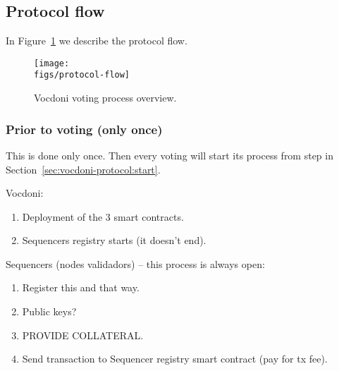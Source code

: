 \subsection{Protocol flow}
\label{sec:vocdoni-protocol:flow}

In Figure~\ref{fig:protocol-flow} we describe the protocol flow.


\begin{figure}[H]
	\centerline{\texttt{[image: \\figs/protocol-flow]}}
	\caption{Vocdoni voting process overview.}
	\label{fig:protocol-flow}
\end{figure}

\subsubsection{Prior to voting (only once)}
\label{sec:vocdoni-protocol:prior-steps}


This is done only once. Then every voting will start its process from step in Section~\ref{sec:vocdoni-protocol:start}.

Vocdoni:
\begin{enumerate}
	\item Deployment of the 3 smart contracts.
	\item Sequencers registry starts (it doesn't end).
\end{enumerate}

Sequencers (nodes validadors) -- this process is always open:
\begin{enumerate}
	\item Register this and that way.
	\item Public keys?
	\item PROVIDE COLLATERAL.
	\item Send transaction to Sequencer registry smart contract (pay for tx fee).
\end{enumerate}

